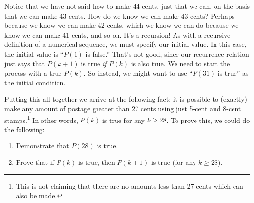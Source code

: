\documentclass[10pt,]{book}
\theoremstyle{plain}
\theoremstyle{definition}
\theoremstyle{definition}
\theoremstyle{definition}
\numberwithin{equation}{chapter}
\begin{document}
Notice that we have not said how to make 44 cents, just that we can, on the basis that we can make 43 cents. How do we know we can make 43 cents? Perhaps because we know we can make \(42\)\label{notation-12}
 cents, which we know we can do because we know we can make 41 cents, and so on. It's a recursion! As with a recursive definition of a numerical sequence, we must specify our initial value. In this case, the initial value is ``\(P(1)\) is false.'' That's not good, since our recurrence relation just says that \(P(k+1)\) is true \emph{if} \(P(k)\) is also true. We need to start the process with a true \(P(k)\). So instead, we might want to use ``\(P(31)\) is true'' as the initial condition.
%
\par

Putting this all together we arrive at the following fact: it is possible to (exactly) make any amount of postage greater than 27 cents using just 5-cent and 8-cent stamps.\footnote{This is not claiming that there are no amounts less than 27 cents which can also be made.\label{fn-7}} In other words, \(P(k)\) is true for any \(k \ge 28\). To prove this, we could do the following:
\leavevmode%
\begin{enumerate}
\item\hypertarget{li-942}{}
Demonstrate that \(P(28)\) is true.
%
\item\hypertarget{li-943}{}
Prove that if \(P(k)\) is true, then \(P(k+1)\) is true (for any \(k \ge 28\)).
%
\end{enumerate}

%
\par
\end{document}
